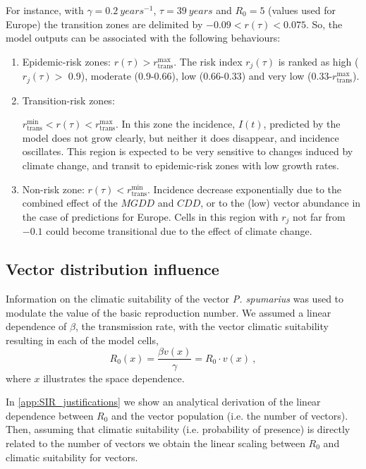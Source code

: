For instance, with $\gamma=\SI{0.2}{years^{-1}}$, $\tau=\SI{39}{years}$ and
$R_0=5$ (values used for Europe) the transition zones are delimited by
$-0.09<r(\tau)<0.075$. So, the model outputs can be associated with the
following behaviours:
\begin{enumerate}
    \item Epidemic-risk zones: $r(\tau)>r_{\textrm{trans}}^{\textrm{max}}$.
          The risk index $r_j(\tau)$ is ranked as high ($r_j(\tau) >$ 0.9),
          moderate
          (0.9-0.66), low (0.66-0.33) and very low
          (0.33-$r_{\textrm{trans}}^{\textrm{max}}$).
    \item Transition-risk zones:

          $r_{\textrm{trans}}^{\textrm{min}}<r(\tau)<r_{\textrm{trans}}^{\textrm{max}}$.
          In this zone the incidence, $I(t)$, predicted by the model does not
          grow
          clearly, but neither it does disappear, and incidence oscillates.
          This region
          is expected to be very sensitive to changes induced by climate
          change, and
          transit to epidemic-risk zones with low growth rates.
    \item Non-risk zone: $r(\tau)<r_{\textrm{trans}}^{\textrm{min}}$.
          Incidence decrease exponentially due to the combined effect of the
          $MGDD$ and
          $CDD$, or to the (low) vector abundance in the case of predictions
          for Europe.
          Cells in this region with $r_j$ not far from $-0.1$ could become
          transitional
          due to the effect of climate change.
\end{enumerate}

\subsection{Vector distribution influence}\label{app:vector_influence}

Information on the climatic suitability of the vector \textit{P. spumarius}
\cite{Godefroid2021} was used to modulate the value of the basic reproduction
number. We assumed a linear dependence of $\beta$, the transmission rate, with
the vector climatic suitability resulting in each of the model cells,
\begin{equation}
    R_0(x)=\frac{\beta v(x)}{\gamma}=R_0\cdot v(x) \ ,
\end{equation}
where $x$ illustrates the space dependence.

In \cref{app:SIR_justifications} we show an analytical derivation of the
linear dependence between $R_0$ and the vector population (i.e. the number of
vectors). Then, assuming that climatic suitability (i.e. probability of
presence) is directly related to the number of vectors we obtain the linear
scaling between $R_0$ and climatic suitability for vectors.

